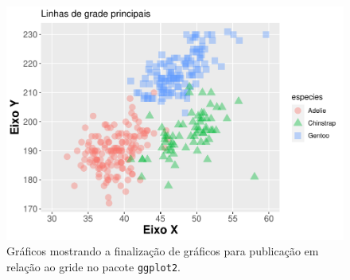 \documentclass[
]{article}
\begin{document}
\begin{figure}
\centering
\includegraphics{epr_files/figure-latex/fig-plot-final-gride-1.pdf}
\caption{\label{fig:fig-plot-final-gride-1}Gráficos mostrando a finalização de gráficos para publicação em relação ao gride no pacote \texttt{ggplot2}.}
\end{figure}
\end{document}
